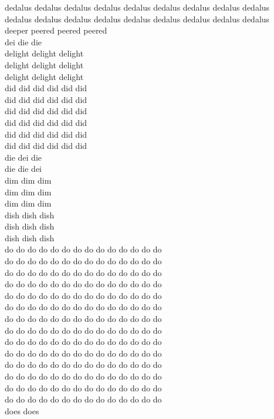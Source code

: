 dedalus dedalus dedalus dedalus dedalus dedalus dedalus dedalus dedalus\\
dedalus dedalus dedalus dedalus dedalus dedalus dedalus dedalus dedalus\\
deeper peered peered peered\\
dei die die\\
delight delight delight\\
delight delight delight\\
delight delight delight\\
did did did did did did\\
did did did did did did\\
did did did did did did\\
did did did did did did\\
did did did did did did\\
did did did did did did\\
die dei die\\
die die dei\\
dim dim dim\\
dim dim dim\\
dim dim dim\\
dish dish dish\\
dish dish dish\\
dish dish dish\\
do do do do do do do do do do do do do do\\
do do do do do do do do do do do do do do\\
do do do do do do do do do do do do do do\\
do do do do do do do do do do do do do do\\
do do do do do do do do do do do do do do\\
do do do do do do do do do do do do do do\\
do do do do do do do do do do do do do do\\
do do do do do do do do do do do do do do\\
do do do do do do do do do do do do do do\\
do do do do do do do do do do do do do do\\
do do do do do do do do do do do do do do\\
do do do do do do do do do do do do do do\\
do do do do do do do do do do do do do do\\
do do do do do do do do do do do do do do\\
does does\\
